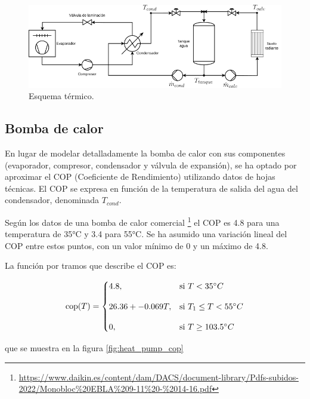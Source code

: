 \begin{figure}[h] \centering
	\centering
	\includegraphics[width=1\textwidth]{./capitulos/resultados_discusion/images/sistema_termico.png}
	\caption{Esquema térmico.}
	\label{fig:thermal_diagram}
\end{figure}

\subsection{Bomba de calor}

En lugar de modelar detalladamente la bomba de calor con sus componentes
(evaporador, compresor, condensador y válvula de expansión), se ha optado por
aproximar el COP (Coeficiente de Rendimiento) utilizando datos de hojas
técnicas. El COP se expresa en función de la temperatura de salida del agua del
condensador, denominada $T_{cond}$.

Según los datos de una bomba de calor comercial
\footnote{\url{https://www.daikin.es/content/dam/DACS/document-library/Pdfs-subidos-2022/Monobloc\%20EBLA\%209-11\%20-\%2014-16.pdf}}
el COP es 4.8 para una temperatura de 35°C y 3.4 para 55°C.
Se ha asumido una variación lineal del COP entre estos puntos, con un valor
mínimo de 0 y un máximo de 4.8.

La función por tramos que describe el COP es:

\begin{equation}
	\text{\text{cop}}(T) =
	\begin{cases}
		4.8,              & \text{si } T < 35^\circ C          \\[10pt]
		26.36 + -0.069 T, & \text{si } T_1 \leq T < 55^\circ C \\[10pt]
		0,                & \text{si } T \geq 103.5^\circ C
	\end{cases}
\end{equation}

que se muestra en la figura \ref{fig:heat_pump_cop}

